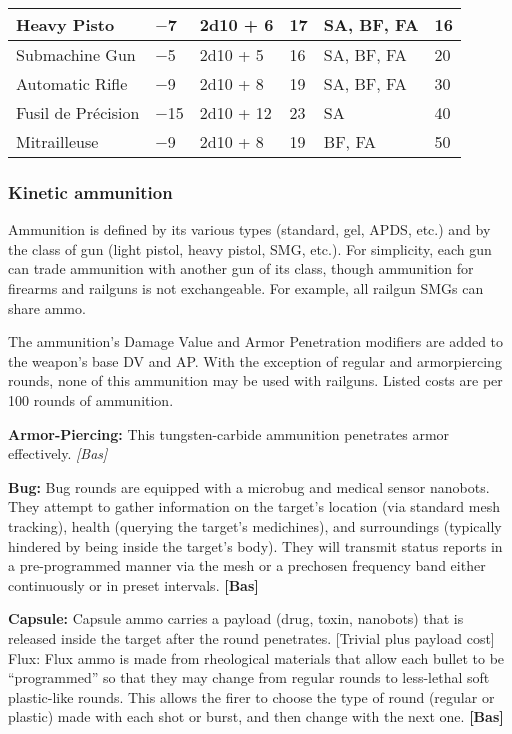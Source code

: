 {{\begin{table}
\begin{tabularx}{\textwidth}{|l|X|X|X|X|l|}
Heavy Pisto	&$-$7	&2d10 + 6	&17	&SA, BF, FA	&16 \\ \hline

Submachine Gun &$-$5	&2d10 + 5	&16	&SA, BF, FA	&20 \\ \hline

Automatic Rifle	&$-$9	&2d10 + 8	&19	&SA, BF, FA	&30 \\ \hline

Fusil de Précision	&$-$15	&2d10 + 12	&23	&SA	&40 \\ \hline

Mitrailleuse	&$-$9	&2d10 + 8	&19	&BF, FA	&50 \\ \hline

\end{tabularx} \label{tab:kinetic-railguns} \end{table} 

\subsubsection{Kinetic ammunition} 

Ammunition is defined by its various types (standard, gel, APDS, etc.) and by the class of gun (light pistol, heavy pistol, SMG, etc.). For simplicity, each gun can trade ammunition with another gun of its class, though ammunition for firearms and railguns is not exchangeable. For example, all railgun SMGs can share ammo. 

The ammunition’s Damage Value and Armor Penetration modifiers are added to the weapon’s base DV and AP. With the exception of regular and armorpiercing rounds, none of this ammunition may be used with railguns. Listed costs are per 100 rounds of ammunition. 

\textbf{Armor-Piercing:} This tungsten-carbide ammunition penetrates armor effectively. \textit{[Bas]} 

\textbf{Bug:} Bug rounds are equipped with a microbug and medical sensor nanobots. They attempt to gather information on the target’s location (via standard mesh tracking), health (querying the target’s medichines), and surroundings (typically hindered by being inside the target’s body). They will transmit status reports in a pre-programmed manner via the mesh or a prechosen frequency band either continuously or in preset intervals. \textbf{[Bas]} 

\textbf{Capsule:} Capsule ammo carries a payload (drug, toxin, nanobots) that is released inside the target after the round penetrates. [Trivial plus payload cost] Flux: Flux ammo is made from rheological materials that allow each bullet to be ``programmed'' so that they may change from regular rounds to less-lethal soft plastic-like rounds. This allows the firer to choose the type of round (regular or plastic) made with each shot or burst, and then change with the next one. \textbf{[Bas]} 

}}
